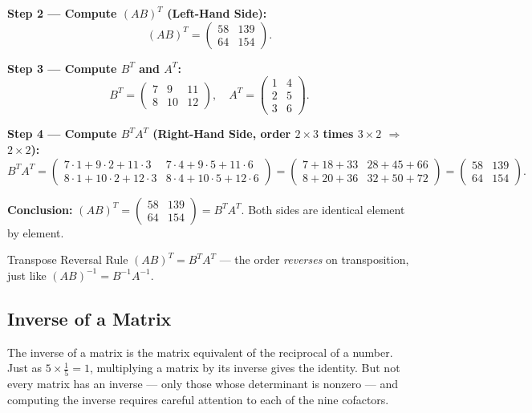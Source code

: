 \documentclass[12pt,a4paper]{article}
\begin{document}
\textbf{Step 2 --- Compute $(AB)^T$ (Left-Hand Side):}
\[
(AB)^T = \begin{pmatrix} 58 & 139 \\ 64 & 154 \end{pmatrix}.
\]

\textbf{Step 3 --- Compute $B^T$ and $A^T$:}
\[
B^T = \begin{pmatrix} 7 & 9 & 11 \\ 8 & 10 & 12 \end{pmatrix}, \quad A^T = \begin{pmatrix} 1 & 4 \\ 2 & 5 \\ 3 & 6 \end{pmatrix}.
\]

\textbf{Step 4 --- Compute $B^T A^T$ (Right-Hand Side, order $2 \times 3$ times $3 \times 2$ $\Rightarrow$ $2 \times 2$):}
\[
B^T A^T = \begin{pmatrix} 7\cdot1+9\cdot2+11\cdot3 & 7\cdot4+9\cdot5+11\cdot6 \\ 8\cdot1+10\cdot2+12\cdot3 & 8\cdot4+10\cdot5+12\cdot6 \end{pmatrix} = \begin{pmatrix} 7+18+33 & 28+45+66 \\ 8+20+36 & 32+50+72 \end{pmatrix} = \begin{pmatrix} 58 & 139 \\ 64 & 154 \end{pmatrix}.
\]

\textbf{Conclusion:} $(AB)^T = \begin{pmatrix} 58 & 139 \\ 64 & 154 \end{pmatrix} = B^T A^T$. Both sides are identical element by element. \checkmark

\begin{learnbox}{Transpose Reversal Rule}
$(AB)^T = B^T A^T$ --- the order \emph{reverses} on transposition, just like $(AB)^{-1} = B^{-1}A^{-1}$.
\end{learnbox}

\subsection{Inverse of a Matrix}

The inverse of a matrix is the matrix equivalent of the reciprocal of a number. Just as $5 \times \frac{1}{5} = 1$, multiplying a matrix by its inverse gives the identity. But not every matrix has an inverse --- only those whose determinant is nonzero --- and computing the inverse requires careful attention to each of the nine cofactors.
\end{document}
